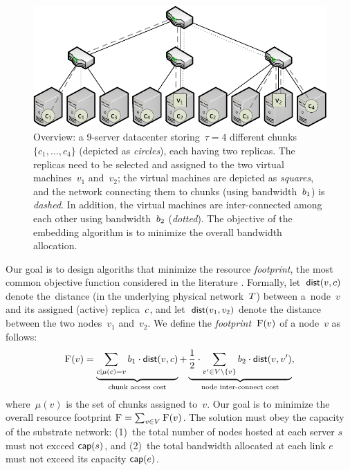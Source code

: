 \begin{figure}[t]
\centering
\includegraphics[width=0.79\columnwidth]{figs/static-mapping/data_locality_no_legend.pdf}
\caption{Overview: a 9-server datacenter storing~$\tau=4$ different chunks~$\{c_1,\ldots,c_4\}$ (depicted as \emph{circles}), each having two replicas. The replicas need to be selected and assigned to the two
 virtual machines~$v_1$ and~$v_2$; the virtual machines are depicted as \emph{squares}, and
 the network connecting them to chunks (using bandwidth~$b_1$) is \emph{dashed}. In addition, the virtual machines are inter-connected among
 each other using bandwidth~$b_2$ (\emph{dotted}). The objective of the embedding algorithm is to minimize the overall bandwidth allocation.}\label{fig:overview}
\end{figure}


Our goal is to design algoriths that minimize the resource \emph{footprint}, the most common objective function considered in the literature \cite{fischer-survey}.
Formally, let~$\mathrm{\textsf{dist}}(v,c)$ denote the~distance (in the underlying physical network~$T$) between a~node~$v$ and
its assigned (active) replica~$c$, and let~$\mathrm{\textsf{dist}}(v_1,v_2)$ denote the distance between the two nodes~$v_1$ and~$v_2$.
We define the \emph{footprint}~$\textsc{F}(v)$ of a node~$v$ as follows:
$$
\textsc{F}(v) = \underbrace{\sum_{c \mid \mu(c) = v} b_1 \cdot \mathrm{\textsf{dist}}(v,c)}_{\text{chunk access cost}} +  \underbrace{\frac{1}{2} \cdot \sum_{v' \in V\setminus\{v\}} b_2 \cdot \mathrm{\textsf{dist}}(v,v')}_{\text{node inter-connect cost}},
$$
where~$\mu(v)$ is the set of chunks assigned to~$v$.
Our goal is to minimize the overall resource footprint $\textsc{F}=\sum_{v\in V} \textsc{F}(v)$.
The solution must obey the capacity of the substrate network: (1)~the total number of nodes hosted at each server $s$ must not excced $\textsf{cap}(s)$, and (2)~the total bandwidth allocated at each link $e$ must not exceed its capacity $\textsf{cap}(e)$.


